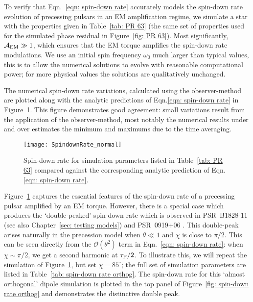 \documentclass[../full_thesis/full_thesis.tex]{subfiles}
\newcommand{\thisdir}{../inertial_frame}
\begin{document}
To verify that Eqn.~\eqref{eqn: spin-down rate} accurately models the spin-down
rate evolution of precessing pulsars in an EM amplification regime, we simulate
a star with the properties given in Table~\ref{tab: PR 63} (the same set of
properties used for the simulated phase residual in Figure~\ref{fig: PR 63}).
Most significantly, $\mathcal{A}_{\mathrm{EM}} \gg 1$, which ensures that the EM torque amplifies
the spin-down rate modulations. We use an initial spin frequency $\omega_0$
much larger than typical values, this is to allow the numerical solutions to
evolve with reasonable computational power; for more physical values the
solutions are qualitatively unchanged.
%

The numerical spin-down rate variations, calculated using the observer-method
are plotted along with the analytic predictions of Eqn.\eqref{eqn: spin-down rate}
in Figure~\ref{fig: spin-down rate normal}.
This figure demonstrates good agreement: small variations result from the
application of the observer-method, most notably the numerical results under
and over estimates the minimum and maximums due to the time averaging.
\begin{figure}[htb]
\centering
\texttt{[image: SpindownRate\_normal]}
\caption{Spin-down rate for simulation parameters listed in Table~\ref{tab: PR
63} compared against the corresponding analytic prediction
of Eqn.\eqref{eqn: spin-down rate}.}
\label{fig: spin-down rate normal}
\end{figure}

Figure~\ref{fig: spin-down rate normal} captures the essential features of the
spin-down rate of a precessing pulsar amplified by an EM torque. However, there
is a special case which produces the `double-peaked' spin-down rate which is
observed in PSR~B1828-11 \citep{Lyne2010} (see also Chapter~\ref{sec: testing
models}) and PSR~0919+06 \citep{Perera2015}.  This double-peak arises naturally
in the precession model when $\theta \ll 1$ and $\chi$ is close to $\pi/2$.
This can be seen directly from the $\mathcal{O}(\theta^{2})$ term in
Eqn.~\eqref{eqn: spin-down rate}: when $\chi \sim \pi/2$, we get a second
harmonic at $\tau_{\mathrm{P}}/2$. To illustrate this, we will repeat the simulation of
Figure~\ref{fig: spin-down rate normal}, but set $\chi=85^{\circ}$; the full
set of simulation parameters are listed in Table~\ref{tab: spin-down rate
orthog}.
The spin-down rate for this `almost orthogonal' dipole simulation is plotted
in the top panel of Figure~\ref{fig: spin-down rate orthog} and demonstrates the
distinctive double peak.
\end{document}
